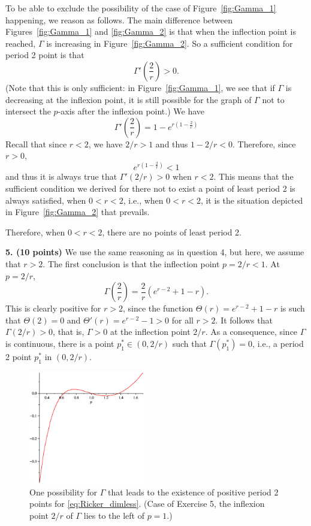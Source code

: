 \documentclass[12pt]{article}
\theoremstyle{plain}
\begin{document}
To be able to exclude the possibility of the case of Figure~\ref{fig:Gamma_1}
happening, we reason as follows. The main difference between
Figures~\ref{fig:Gamma_1} and \ref{fig:Gamma_2} is that when the inflection
point is reached, $\Gamma$ is increasing in Figure~\ref{fig:Gamma_2}. So a
sufficient condition for period 2 point is that
\[
\Gamma'\left(\frac 2r \right)>0.
\]
(Note that this is only sufficient: in Figure~\ref{fig:Gamma_1}, we see that if
$\Gamma$ is decreasing at the inflexion point, it is still possible for the
graph of $\Gamma$ not to intersect the $p$-axis after the inflexion point.)
We have
\[
\Gamma'\left(\frac 2r \right)=1-e^{r\left(1-\frac{2}{r}\right)}
\]
Recall that since $r<2$, we have $2/r>1$ and thus $1-2/r<0$. Therefore, since
$r>0$,
\[
e^{r\left(1-\frac{2}{r}\right)}<1
\]
and thus it is always true that $\Gamma'(2/r)>0$ when $r<2$. This means that
the sufficient condition we derived for there not to exist a point of least
period 2 is always satisfied, when $0<r<2$, i.e., when $0<r<2$, it is the
situation depicted in Figure~\ref{fig:Gamma_2} that prevails.

Therefore, when $0<r<2$, there are no points of least period 2.





\vskip0.4cm
\noindent
{\bf 5.  (10 points)} 
We use the same reasoning as in question 4, but here, we assume that $r>2$. The
first conclusion is that the inflection point $p=2/r<1$. At $p=2/r$,
\[
\Gamma\left(\frac 2r\right)=\frac 2r\left(e^{r-2}+1-r\right).
\]
This is clearly positive for $r>2$, since the function $\Theta(r)=e^{r-2}+1-r$
is such that $\Theta(2)=0$ and $\Theta'(r)=e^{r-2}-1>0$ for all $r>2$. It
follows that $\Gamma(2/r)>0$, that is, $\Gamma>0$ at the inflection point
$2/r$. As a consequence, since $\Gamma$ is continuous, there is a point $p_1^*\in(0,2/r)$ such that $\Gamma(p_1^*)=0$, i.e., a period 2 point $p_1^*$ in $(0,2/r)$.

\begin{figure}[htbp]
\begin{center}
\includegraphics[width=0.45\textwidth]{winter2008_assign1_fig1_c}
\caption{One possibility for $\Gamma$ that leads to the existence of positive
period 2 points for \eqref{eq:Ricker_dimless}. (Case of Exercise 5, the
inflexion point $2/r$ of $\Gamma$ lies to the left of $p=1$.)}
\label{fig:Gamma_2b}
\end{center}
\end{figure}
\end{document}
